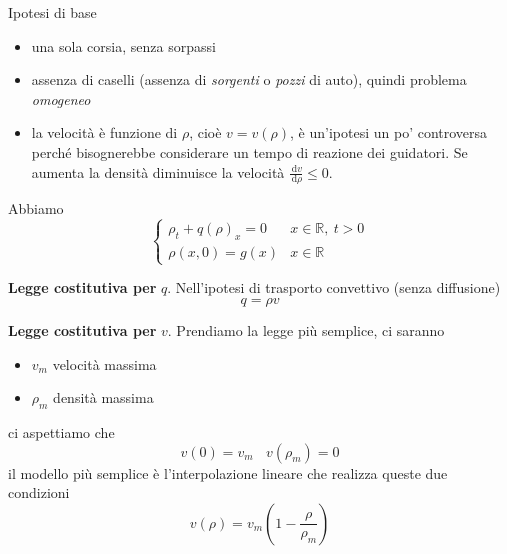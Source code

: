 \documentclass[10pt,a4paper,twoside,openright]{book}
\newcommand{\de}{\,\mathrm d}
\newcommand{\dv}{\de v}
\newcommand{\drho}{\de \rho}
\begin{document}
Ipotesi di base
\begin{itemize}
    \item una sola corsia, senza sorpassi
    \item assenza di caselli (assenza di \textit{sorgenti} o \textit{pozzi} di auto), quindi problema \emph{omogeneo}
    \item la velocità è funzione di $\rho $, cioè $v=v(\rho)$, è un'ipotesi un po' controversa perché bisognerebbe considerare un tempo di reazione dei guidatori. Se aumenta la densità diminuisce la velocità $\frac{\dv}{\drho} \leqslant 0$.
\end{itemize}

Abbiamo
\begin{equation}
    \begin{cases}
        \rho _{t} +q(\rho)_{x} =0 & x\in \mathbb{R} ,\ t >0 \\
        \rho (x,0) =g(x)          & x\in \mathbb{R}
    \end{cases}
\end{equation}

\textbf{Legge costitutiva per} $q$.
Nell'ipotesi di trasporto convettivo (senza diffusione)
\begin{equation}
    q=\rho v
\end{equation}

\textbf{Legge costitutiva per} $v$.
Prendiamo la legge più semplice, ci saranno
\begin{itemize}
    \item $v_{m}$ velocità massima
    \item $\rho _{m}$ densità massima
\end{itemize}

ci aspettiamo che
\begin{equation*}
    v(0) =v_{m} \ \ \ \ v(\rho _{m}) =0
\end{equation*}
il modello più semplice è l'interpolazione lineare che realizza queste due condizioni
\begin{equation}
    v(\rho) =v_{m}\left(1-\frac{\rho }{\rho _{m}}\right)
\end{equation}
\end{document}
